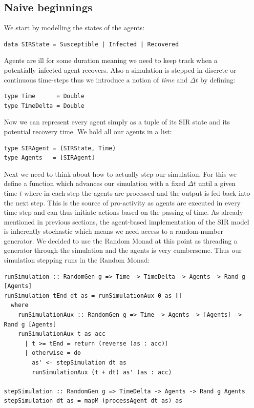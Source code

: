\subsection{Naive beginnings}
We start by modelling the states of the agents:

\begin{verbatim}
data SIRState = Susceptible | Infected | Recovered
\end{verbatim}

Agents are ill for some duration meaning we need to keep track when a potentially infected agent recovers. Also a simulation is stepped in discrete or continuous time-steps thus we introduce a notion of \textit{time} and $\Delta t$ by defining:

\begin{verbatim}
type Time      = Double
type TimeDelta = Double
\end{verbatim}

Now we can represent every agent simply as a tuple of its SIR state and its potential recovery time. We hold all our agents in a list:
\begin{verbatim}
type SIRAgent = (SIRState, Time)
type Agents   = [SIRAgent]
\end{verbatim}

Next we need to think about how to actually step our simulation. For this we define a function which advances our simulation with a fixed $\Delta t$ until a given time $t$ where in each step the agents are processed and the output is fed back into the next step. This is the source of pro-activity as agents are executed in every time step and can thus initiate actions based on the passing of time.
As already mentioned in previous sections, the agent-based implementation of the SIR model is inherently stochastic which means we need access to a random-number generator. We decided to use the Random Monad at this point as threading a generator through the simulation and the agents is very cumbersome. Thus our simulation stepping runs in the Random Monad:

\begin{verbatim}
runSimulation :: RandomGen g => Time -> TimeDelta -> Agents -> Rand g [Agents]
runSimulation tEnd dt as = runSimulationAux 0 as []
  where
    runSimulationAux :: RandomGen g => Time -> Agents -> [Agents] -> Rand g [Agents]
    runSimulationAux t as acc
      | t >= tEnd = return (reverse (as : acc))
      | otherwise = do
        as' <- stepSimulation dt as 
        runSimulationAux (t + dt) as' (as : acc)

stepSimulation :: RandomGen g => TimeDelta -> Agents -> Rand g Agents
stepSimulation dt as = mapM (processAgent dt as) as
\end{verbatim}

